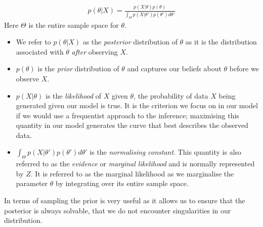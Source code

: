 \documentclass[11pt]{article} %
\begin{document}
	\begin{align} \label{Bayes_theorem}
	p(\theta | X) = \frac{p(X | \theta) p(\theta)}{\int_\Theta p(X | \theta ') p(\theta ') d \theta '}
	\end{align}
	Here $\Theta$ is the entire sample space for $\theta$. 
	\begin{itemize}
		\item We refer to $p(\theta | X)$ as the \emph{posterior} distribution of $\theta$ as it is the distribution associated with $\theta$ \emph{after} observing $X$.
		\item $p(\theta)$ is the \emph{prior} distribution of $\theta$ and captures our beliefs about $\theta$ before we observe $X$.
		\item $p(X | \theta)$ is the \emph{likelihood} of $X$ given $\theta$, the probability of data $X$ being generated given our model is true. It is the criterion we focus on in our model if we would use a frequentist approach to the inference; maximising this quantity in our model generates the curve that best describes the observed data. 
		\item $\int_\Theta p(X | \theta ') p(\theta ') d \theta '$ is the \emph{normalising constant}. This quantity is also referred to as the \emph{evidence} \cite{mackay_information_2003} or \emph{marginal likelihood} and is normally represented by $Z$. It is referred to as the marginal likelihood as we marginalise the parameter $\theta$ by integrating over its entire sample space.
	\end{itemize}
	
	In terms of sampling the prior is very useful as it allows us to ensure that the posterior is always solvable, that we do not encounter singularities in our distribution.
	
\end{document}
